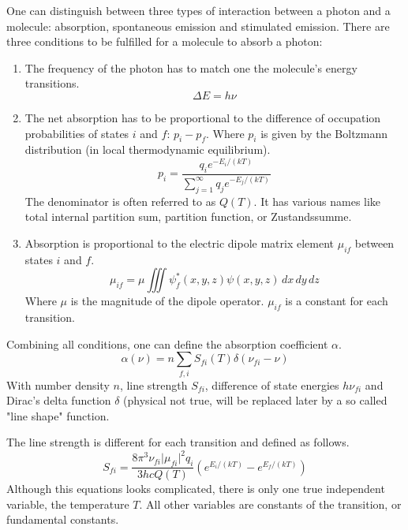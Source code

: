 \documentclass[a4paper,fleqn]{article}
\begin{document}
One can distinguish between three types of interaction between a photon and a
molecule: absorption, spontaneous emission and stimulated emission.  There are
three conditions to be fulfilled for a molecule to absorb a photon:
\begin{enumerate}
\item The frequency of the photon has to match one the molecule's energy
transitions.
\begin{equation}
  \Delta E = h \nu
\end{equation}

\item The net absorption has to be proportional to the difference of occupation
probabilities of states $i$ and $f$: $p_i - p_f$. Where $p_i$ is given by the
Boltzmann distribution (in local thermodynamic equilibrium).
\begin{equation}
  p_i = \frac{q_i e^{-E_i / (kT)}}
        {\sum_{j=1}^\infty q_j e^{-E_j / (kT)}}
\end{equation}
The denominator is often referred to as $Q(T)$. It has various names like total
internal partition sum, partition function, or Zustandssumme.

\item Absorption is proportional to the electric dipole matrix element $\mu_{if}$
between states $i$ and $f$.
\begin{equation}
  \mu_{if} = \mu \iiint \psi_f^*(x,y,z) \psi(x,y,z) \,dx\,dy\,dz
\end{equation}
Where $\mu$ is the magnitude of the dipole operator. $\mu_{if}$ is a constant
for each transition.
\end{enumerate}

Combining all conditions, one can define the absorption coefficient $\alpha$.
\begin{equation}
  \alpha(\nu) = n \sum_{f,i} S_{fi}(T) \delta(\nu_{fi} - \nu)
\end{equation}
With number density $n$, line strength $S_{fi}$, difference of state energies
$h\nu_{fi}$ and Dirac's delta function $\delta$ (physical not true, will be
replaced later by a so called "line shape" function.

The line strength is different for each transition and defined as follows.
\begin{equation}
    S_{fi} = \frac{8\pi^3\nu_{fi} \lvert\mu_{fi}\rvert^2 q_i}{3hcQ(T)}
      \left( e^{E_i/(kT)} - e^{E_f/(kT)} \right)
\end{equation}
Although this equations looks complicated, there is only one true independent
variable, the temperature $T$. All other variables are constants of the
transition, or fundamental constants.
\end{document}
